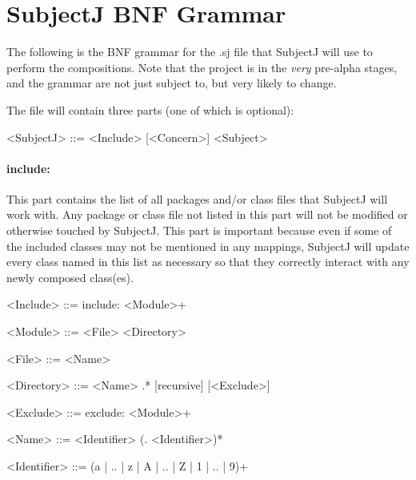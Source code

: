 \documentclass[11pt,letterpaper]{article}
\begin{document}
    \section*{SubjectJ BNF Grammar}
    The following is the BNF grammar for the .sj file that SubjectJ will use to perform the compositions. Note that the project is in the \emph{very} pre-alpha stages, and the grammar are not just subject to, but very likely to change.
    
    The file will contain three parts (one of which is optional):
    
    \begin{grammar}
        <SubjectJ> ::= <Include> [<Concern>] <Subject>
    \end{grammar}
    
    \paragraph{include:}
    This part contains the list of all packages and/or class files that SubjectJ will work with. Any package or class file not listed in this part will not be modified or otherwise touched by SubjectJ. This part is important because even if some of the included classes may not be mentioned in any mappings, SubjectJ will update every class named in this list as necessary so that they correctly interact with any newly composed class(es).
    \begin{grammar}
        <Include> ::= include: <Module>+

        <Module> ::= <File>
        \alt <Directory>

        <File> ::= <Name>

        <Directory> ::= <Name> .* [recursive] [<Exclude>]

        <Exclude> ::= exclude: <Module>+

        <Name> ::= <Identifier> (. <Identifier>)*

        <Identifier> ::= (a | .. | z | A | .. | Z | 1 | .. | 9)+
    \end{grammar}
\end{document}
